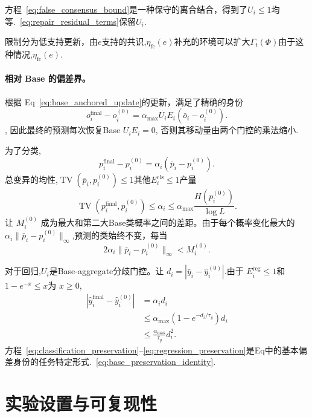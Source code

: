 方程~\eqref{eq:false_consensus_bound}是一种保守的离合结合，得到了$U_i\leq1$均等.~\eqref{eq:repair_residual_terms}保留$U_i$.

限制分为低支持更新，由$e$支持的共识,$\eta_{\mathrm{fc}}(e)$补充的环境可以扩大$\Gamma_t(\Phi)$由于这种情况,$\eta_{\mathrm{fc}}(e)$.

\paragraph{相对 Base 的偏差界。}
\label{app:base-preservation}

根据 Eq~\eqref{eq:base_anchored_update}的更新，满足了精确的身份 \[
o_i^{\mathrm{final}}-o_i^{(0)}
=\alpha_{\max}U_iE_i(\bar o_i-o_i^{(0)}).
\], 因此最终的预测每次恢复Base $U_iE_i=0$, 否则其移动量由两个门控的乘法缩小.

为了分类,\[
p_i^{\mathrm{final}}-p_i^{(0)}
=\alpha_i(\bar p_i-p_i^{(0)}).
\]总变异的均性,$\operatorname{TV}(\bar p_i,p_i^{(0)})\leq1$其他$E_i^{\mathrm{cls}}\leq1$产量
\begin{equation}
\operatorname{TV}(p_i^{\mathrm{final}},p_i^{(0)})
\leq\alpha_i
\leq\alpha_{\max}\frac{H(p_i^{(0)})}{\log L}.
\label{eq:classification_preservation}
\end{equation}
让 $M_i^{(0)}$ 成为最大和第二大Base类概率之间的差距。由于每个概率变化最大的 $\alpha_i\lVert\bar p_i-p_i^{(0)}\rVert_\infty$,预测的类始终不变，每当
\begin{equation}
2\alpha_i\lVert\bar p_i-p_i^{(0)}\rVert_\infty<M_i^{(0)}.
\label{eq:classification_margin_preservation}
\end{equation}

对于回归,$U_i$是Base-aggregate分歧门控。让 $d_i=|\bar y_i-\hat y_i^{(0)}|$.由于 $E_i^{\mathrm{reg}}\leq1$和 $1-e^{-x}\leq x$为 $x\geq0$,
\begin{equation}
\begin{aligned}
|\hat y_i^{\mathrm{final}}-\hat y_i^{(0)}|
&=\alpha_i d_i\\
&\leq\alpha_{\max}\left(1-e^{-d_i/\tau_y}\right)d_i\\
&\leq\frac{\alpha_{\max}}{\tau_y}d_i^2.
\end{aligned}
\label{eq:regression_preservation}
\end{equation}方程~\eqref{eq:classification_preservation}--\eqref{eq:regression_preservation}是Eq中的基本偏差身份的任务特定形式.~\eqref{eq:base_preservation_identity}.

\section{实验设置与可复现性}
\label{app:experimental_setup}
\label{app:experimental_details}

